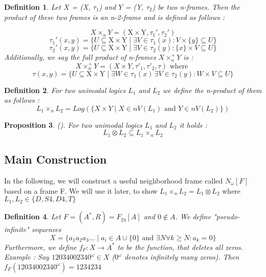 \documentclass[12pt, a4paper]{scrartcl}
\newtheorem{definition}{Definition}[subsection]
\newtheorem{proposition}[definition]{Proposition}
\begin{document}
\vspace{0.5cm}

\begin{definition}
    Let $X$ = (X, $\tau_1$) and $Y$ = (Y, $\tau_2$) be two n-frames. Then the product of these two frames
    is an n-2-frame and is defined as follows : \newline
    
    $$ X \times_n Y = (\mbox{X} \times \mbox{Y}, \tau_1', \tau_2')$$   
    $$ \tau_1'(x,y) = \{ U \subseteq \mbox{X} \times \mbox{Y} \mid \exists V \in \tau_1(x) : V \times  \{ y \} \subseteq U \}$$
    $$ \tau_2'(x,y) = \{ U \subseteq \mbox{X} \times \mbox{Y} \mid \exists V \in \tau_2(y) : \{ x \} \times V \subseteq U \}$$
    Additionally, we say the full product of n-frames $X \times^+_n Y$ is :
    $$ X \times^+_n Y = (X \times Y, \tau'_1, \tau'_2, \tau)\mbox{ where }$$
    $$ \tau(x,y) = \{ U \subseteq \mbox{X} \times \mbox{Y} \mid \exists W \in \tau_1(x) \, \exists V \in \tau_2(y) : W \times V \subseteq U \}$$        
\end{definition}

\begin{definition}
    For two unimodal logics $L_1$ and $L_2$ we define the n-product of them as follows :
    $$ L_1 \times_n L_2 = Log(\{ X \times Y \mid X \in nV(L_1) \mbox{ and } Y \in nV(L_2) \})$$        
\end{definition}

\begin{proposition}(\cite{?}).
    For two unimodal logics $L_1$ and $L_2$ it holds : 
    $$L_1 \otimes L_2 \subseteq L_1 \times_n L_2$$
\end{proposition}



\subsection{Main Construction}
In the following, we will construct a useful neighborhood frame called $N_\omega[F]$ based on a frame F.
We will use it later, to show $L_1 \times_n L_2 = L_1 \otimes L_2$ where $L_1,L_2 \in \{D,S4,D4,T\}$

\begin{definition}
    Let $F = (A^*, R) = F_{\xi \eta}[A]$ and $0 \notin A$. We define "pseudo-infinite" sequences 
    $$X = \{a_1a_2a_3... \mid a_i \in A \cup \{0\} \mbox{ and } \exists N \forall k \geq N : a_k = 0\}$$
    Furthermore, we define $f_F : X \rightarrow A^*$ to be the function, that deletes all zeros. \newline \newline
    Example : Say $12034002340^\omega \in X$ ($0^\omega$ denotes infinitely many zeros). Then $f_F(12034002340^\omega) = 1234234$

\end{definition}
\end{document}
